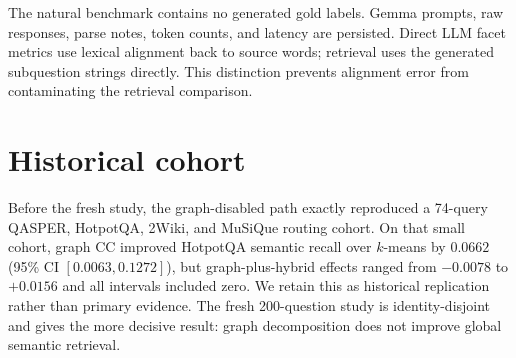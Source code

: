 \documentclass[11pt]{article}
\begin{document}
The natural benchmark contains no generated gold labels. Gemma prompts, raw responses, parse notes, token counts, and latency are persisted. Direct LLM facet metrics use lexical alignment back to source words; retrieval uses the generated subquestion strings directly. This distinction prevents alignment error from contaminating the retrieval comparison.

\section{Historical cohort}
Before the fresh study, the graph-disabled path exactly reproduced a 74-query QASPER, HotpotQA, 2Wiki, and MuSiQue routing cohort. On that small cohort, graph CC improved HotpotQA semantic recall over $k$-means by $0.0662$ (95\% CI $[0.0063,0.1272]$), but graph-plus-hybrid effects ranged from $-0.0078$ to $+0.0156$ and all intervals included zero. We retain this as historical replication rather than primary evidence. The fresh 200-question study is identity-disjoint and gives the more decisive result: graph decomposition does not improve global semantic retrieval.



\end{document}
